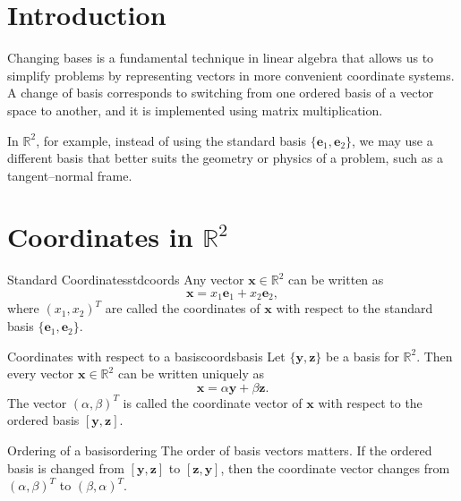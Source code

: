 \documentclass[12pt,a4paper]{article}
\newcommand{\R}{\mathbb{R}}
\newcommand{\vv}[1]{\mathbf{#1}}
\begin{document}
	
	\section{Introduction}
	
	Changing bases is a fundamental technique in linear algebra that allows us to simplify problems by representing vectors in more convenient coordinate systems. A change of basis corresponds to switching from one ordered basis of a vector space to another, and it is implemented using matrix multiplication.
	
	In $\R^2$, for example, instead of using the standard basis $\{\vv{e}_1, \vv{e}_2\}$, we may use a different basis that better suits the geometry or physics of a problem, such as a tangent–normal frame.
	
	\section{Coordinates in $\R^2$}
	
	\begin{definition}{Standard Coordinates}{stdcoords}
		Any vector $\vv{x} \in \R^2$ can be written as
		\[
		\vv{x} = x_1 \vv{e}_1 + x_2 \vv{e}_2,
		\]
		where $(x_1, x_2)^T$ are called the coordinates of $\vv{x}$ with respect to the standard basis $\{\vv{e}_1, \vv{e}_2\}$.
	\end{definition}
	
	\begin{definition}{Coordinates with respect to a basis}{coordsbasis}
		Let $\{\vv{y}, \vv{z}\}$ be a basis for $\R^2$. Then every vector $\vv{x} \in \R^2$ can be written uniquely as
		\[
		\vv{x} = \alpha \vv{y} + \beta \vv{z}.
		\]
		The vector $(\alpha, \beta)^T$ is called the coordinate vector of $\vv{x}$ with respect to the ordered basis $[\vv{y}, \vv{z}]$.
	\end{definition}
	
	\begin{remark}{Ordering of a basis}{ordering}
		The order of basis vectors matters. If the ordered basis is changed from $[\vv{y}, \vv{z}]$ to $[\vv{z}, \vv{y}]$, then the coordinate vector changes from $(\alpha, \beta)^T$ to $(\beta, \alpha)^T$.
	\end{remark}
	
\end{document}
